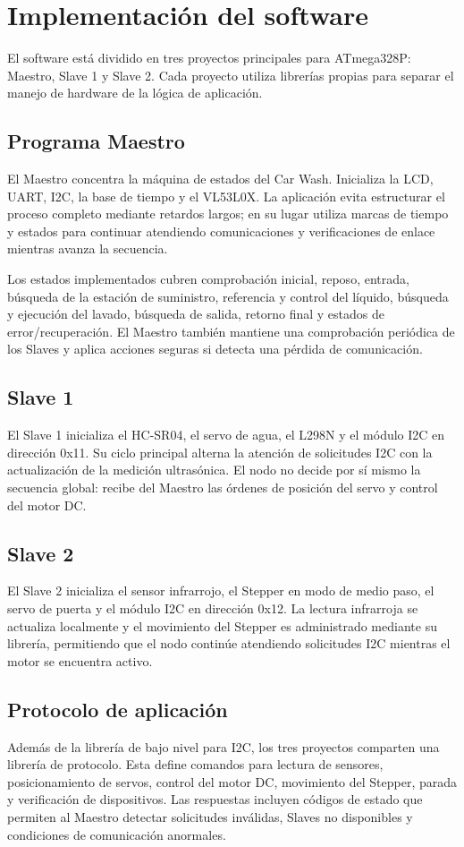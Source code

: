 \section{Implementación del software}

El software está dividido en tres proyectos principales para ATmega328P: Maestro, Slave 1 y Slave 2. Cada proyecto utiliza librerías propias para separar el manejo de hardware de la lógica de aplicación.

\subsection{Programa Maestro}
El Maestro concentra la máquina de estados del Car Wash. Inicializa la LCD, UART, I2C, la base de tiempo y el VL53L0X. La aplicación evita estructurar el proceso completo mediante retardos largos; en su lugar utiliza marcas de tiempo y estados para continuar atendiendo comunicaciones y verificaciones de enlace mientras avanza la secuencia.

Los estados implementados cubren comprobación inicial, reposo, entrada, búsqueda de la estación de suministro, referencia y control del líquido, búsqueda y ejecución del lavado, búsqueda de salida, retorno final y estados de error/recuperación. El Maestro también mantiene una comprobación periódica de los Slaves y aplica acciones seguras si detecta una pérdida de comunicación.

\subsection{Slave 1}
El Slave 1 inicializa el HC-SR04, el servo de agua, el L298N y el módulo I2C en dirección 0x11. Su ciclo principal alterna la atención de solicitudes I2C con la actualización de la medición ultrasónica. El nodo no decide por sí mismo la secuencia global: recibe del Maestro las órdenes de posición del servo y control del motor DC.

\subsection{Slave 2}
El Slave 2 inicializa el sensor infrarrojo, el Stepper en modo de medio paso, el servo de puerta y el módulo I2C en dirección 0x12. La lectura infrarroja se actualiza localmente y el movimiento del Stepper es administrado mediante su librería, permitiendo que el nodo continúe atendiendo solicitudes I2C mientras el motor se encuentra activo.

\subsection{Protocolo de aplicación}
Además de la librería de bajo nivel para I2C, los tres proyectos comparten una librería de protocolo. Esta define comandos para lectura de sensores, posicionamiento de servos, control del motor DC, movimiento del Stepper, parada y verificación de dispositivos. Las respuestas incluyen códigos de estado que permiten al Maestro detectar solicitudes inválidas, Slaves no disponibles y condiciones de comunicación anormales.

